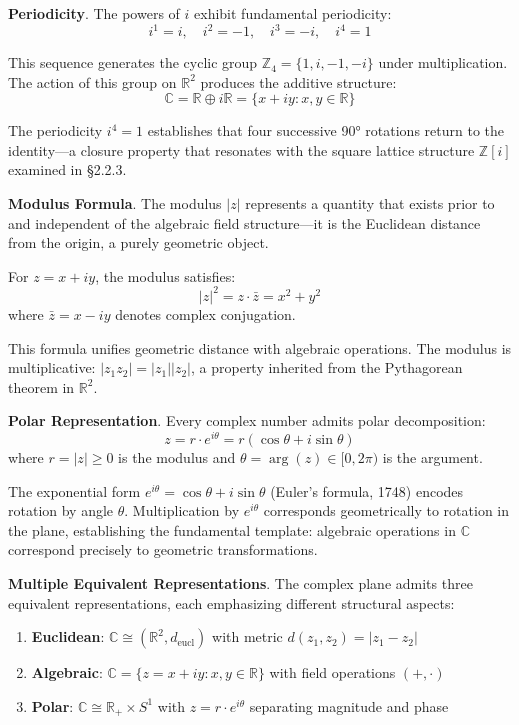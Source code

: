     \textbf{Periodicity}. The powers of $i$ exhibit fundamental periodicity:
    \[
        i^1 = i, \quad i^2 = -1, \quad i^3 = -i, \quad i^4 = 1
    \]

    This sequence generates the cyclic group $\mathbb{Z}_4 = \{1, i, -1, -i\}$ under multiplication. The action of this group on $\mathbb{R}^2$ produces the additive structure:
    \[
        \mathbb{C} = \mathbb{R} \oplus i\mathbb{R} = \{x + iy : x, y \in \mathbb{R}\}
    \]

    The periodicity $i^4 = 1$ establishes that four successive 90° rotations return to the identity—a closure property that resonates with the square lattice structure $\mathbb{Z}[i]$ examined in \S 2.2.3.

    \textbf{Modulus Formula}. The modulus $|z|$ represents a quantity that exists prior to and independent of the algebraic field structure—it is the Euclidean distance from the origin, a purely geometric object.

    \begin{Proposition} \label{prop:geometric-algebraic-duality}
        For $z = x + iy$, the modulus satisfies:
        \[
            |z|^2 = z \cdot \bar{z} = x^2 + y^2
        \]
        where $\bar{z} = x - iy$ denotes complex conjugation.
    \end{Proposition}

    This formula unifies geometric distance with algebraic operations. The modulus is multiplicative: $|z_1z_2| = |z_1||z_2|$, a property inherited from the Pythagorean theorem in $\mathbb{R}^2$.

    \textbf{Polar Representation}. Every complex number admits polar decomposition:
    \[
        z = r \cdot e^{i\theta} = r(\cos\theta + i\sin\theta)
    \]
    where $r = |z| \geq 0$ is the modulus and $\theta = \arg(z) \in [0, 2\pi)$ is the argument.

    The exponential form $e^{i\theta} = \cos \theta + i \sin \theta$ (Euler's formula, 1748) encodes rotation by angle $\theta$. Multiplication by $e^{i\theta}$ corresponds geometrically to rotation in the plane, establishing the fundamental template: algebraic operations in $\mathbb{C}$ correspond precisely to geometric transformations.

    \textbf{Multiple Equivalent Representations}. The complex plane admits three equivalent representations, each emphasizing different structural aspects:
    \begin{enumerate}
        \item \textbf{Euclidean}: $\mathbb{C} \cong (\mathbb{R}^2, d_{\text{eucl}})$ with metric $d(z_1, z_2) = |z_1 - z_2|$
        \item \textbf{Algebraic}: $\mathbb{C} = \{z = x + iy : x, y \in \mathbb{R}\}$ with field operations $(+, \cdot)$
        \item \textbf{Polar}: $\mathbb{C} \cong \mathbb{R}_+ \times S^1$ with $z = r\cdot e^{i\theta}$ separating magnitude and phase
    \end{enumerate}

